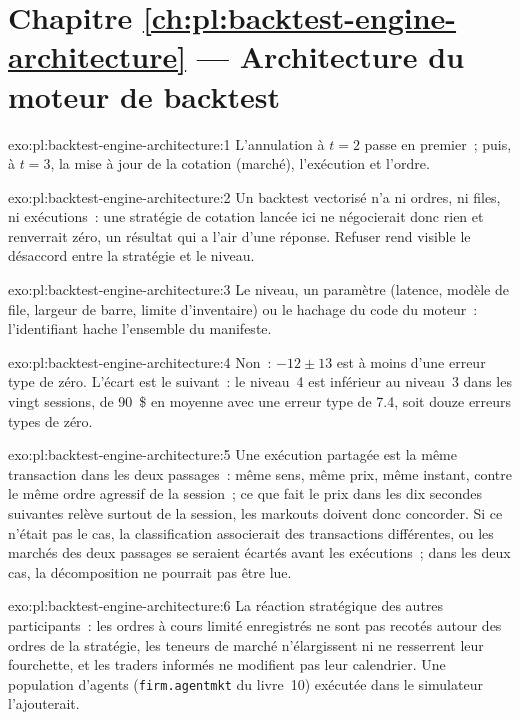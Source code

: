 \section*{Chapitre \ref{ch:pl:backtest-engine-architecture} --- Architecture du moteur de backtest}

\begin{solution}{exo:pl:backtest-engine-architecture:1}
L'annulation à $t = 2$ passe en premier~; puis, à $t = 3$, la mise à jour de la cotation (marché), l'exécution et l'ordre.
\end{solution}

\begin{solution}{exo:pl:backtest-engine-architecture:2}
Un backtest vectorisé n'a ni ordres, ni files, ni exécutions~: une stratégie de cotation lancée ici ne négocierait donc rien et renverrait zéro, un résultat qui
a l'air d'une réponse. Refuser rend visible le désaccord entre la stratégie et le niveau.
\end{solution}

\begin{solution}{exo:pl:backtest-engine-architecture:3}
Le niveau, un paramètre (latence, modèle de file, largeur de barre, limite d'inventaire) ou le hachage du code du moteur~: l'identifiant
hache l'ensemble du manifeste.
\end{solution}

\begin{solution}{exo:pl:backtest-engine-architecture:4}
Non~: $-12 \pm 13$ est à moins d'une erreur type de zéro. L'écart est le suivant~: le niveau~4 est inférieur au niveau~3 dans les vingt
sessions, de 90~\$ en moyenne avec une erreur type de 7.4, soit douze erreurs types de zéro.
\end{solution}

\begin{solution}{exo:pl:backtest-engine-architecture:5}
Une exécution partagée est la même transaction dans les deux passages~: même sens, même prix, même instant, contre le même ordre agressif de la session~; ce que fait
le prix dans les dix secondes suivantes relève surtout de la session, les markouts doivent donc concorder. Si ce n'était pas le cas, la classification
associerait des transactions différentes, ou les marchés des deux passages se seraient écartés avant les exécutions~; dans les deux cas, la
décomposition ne pourrait pas être lue.
\end{solution}

\begin{solution}{exo:pl:backtest-engine-architecture:6}
La réaction stratégique des autres participants~: les ordres à cours limité enregistrés ne sont pas recotés autour des ordres de la stratégie, les teneurs de marché
n'élargissent ni ne resserrent leur fourchette, et les traders informés ne modifient pas leur calendrier. Une population d'agents (\texttt{firm.agentmkt} du livre~10)
exécutée dans le simulateur l'ajouterait.
\end{solution}


